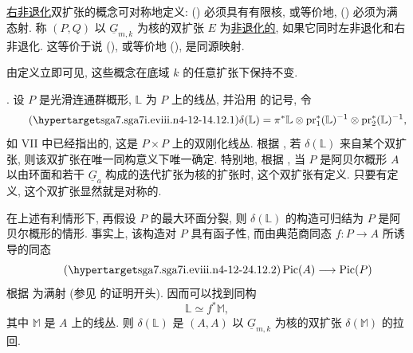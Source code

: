 \underline{右非退化}双扩张的概念可对称地定义: () 必须具有有限核, 或等价地, () 必须为满态射. 称 $(P,Q)$ 以 $\underline G_{m,k}$ 为核的双扩张 $E$ 为\underline{非退化的}, 如果它同时左非退化和右非退化. 这等价于说 (), 或等价地 (), 是同源映射.

由定义立即可见, 这些概念在底域 $k$ 的任意扩张下保持不变.



\medskip
\noindent {}. 设 $P$ 是光滑连通群概形, $\mathbb L$ 为 $P$ 上的线丛, 并沿用  的记号, 令
\begin{equation}\tag{\SGARefTarget{sga7.sga7i.eviii.n4-12-1}{4.12.1}}
 \delta(\mathbb L)=
 \pi^*\mathbb L\otimes
 \pr_1^*(\mathbb L)^{-1}\otimes
 \pr_2^*(\mathbb L)^{-1},
\end{equation}
如 VII  中已经指出的, 这是 $P\times P$ 上的双刚化线丛. 根据 , 若 $\delta(\mathbb L)$ 来自某个双扩张, 则该双扩张在唯一同构意义下唯一确定. 特别地, 根据 , 当 $P$ 是阿贝尔概形 $A$ 以由环面和若干 $\underline G_a$ 构成的迭代扩张为核的扩张时, 这个双扩张有定义. 只要有定义, 这个双扩张显然就是对称的.

在上述有利情形下, 再假设 $P$ 的最大环面分裂, 则 $\delta(\mathbb L)$ 的构造可归结为 $P$ 是阿贝尔概形的情形. 事实上, 该构造对 $P$ 具有函子性, 而由典范商同态 $f:P\longrightarrow A$ 所诱导的同态
\begin{equation}\tag{\SGARefTarget{sga7.sga7i.eviii.n4-12-2}{4.12.2}}
 \Pic(A)\longrightarrow\Pic(P)
\end{equation}
根据  为满射 (参见  的证明开头). 因而可以找到同构
\[
 \mathbb L\simeq f^*\mathbb M,
\]
其中 $\mathbb M$ 是 $A$ 上的线丛. 则 $\delta(\mathbb L)$ 是 $(A,A)$ 以 $\underline G_{m,k}$ 为核的双扩张 $\delta(\mathbb M)$ 的拉回.

